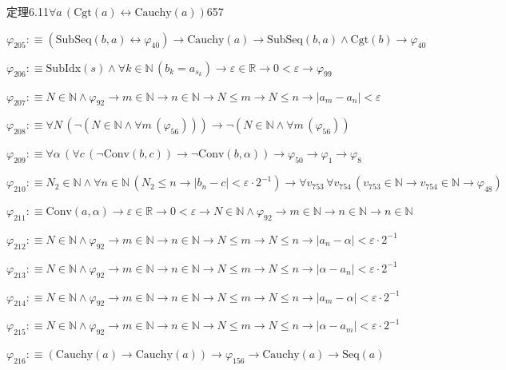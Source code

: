 \begin{fullproof}{定理6.11}{$\forall a\,(\mathrm{Cgt}(a) \leftrightarrow \mathrm{Cauchy}(a))$}{657}
\begin{abbrevlist}
\item $\varphi_{205} :\equiv (\mathrm{SubSeq}(b,a) \leftrightarrow \varphi_{40}) \to \mathrm{Cauchy}(a) \to \mathrm{SubSeq}(b,a) \land \mathrm{Cgt}(b) \to \varphi_{40}$
\item $\varphi_{206} :\equiv \mathrm{SubIdx}(s) \land \forall k \in \mathbb{N}\,(b_{k} = a_{s_{k}}) \to \varepsilon \in \mathbb{R} \to 0 < \varepsilon \to \varphi_{99}$
\item $\varphi_{207} :\equiv N \in \mathbb{N} \land \varphi_{92} \to m \in \mathbb{N} \to n \in \mathbb{N} \to N \leq m \to N \leq n \to \lvert a_{m} - a_{n} \rvert < \varepsilon$
\item $\varphi_{208} :\equiv \forall N\,(\neg (N \in \mathbb{N} \land \forall m\,(\varphi_{56}))) \to \neg (N \in \mathbb{N} \land \forall m\,(\varphi_{56}))$
\item $\varphi_{209} :\equiv \forall \alpha\,(\forall c\,(\neg \mathrm{Conv}(b,c)) \to \neg \mathrm{Conv}(b,\alpha)) \to \varphi_{50} \to \varphi_{1} \to \varphi_{8}$
\item $\varphi_{210} :\equiv N_{2} \in \mathbb{N} \land \forall n \in \mathbb{N}\,(N_{2} \leq n \to \lvert b_{n} - c \rvert < \varepsilon \cdot 2^{-1}) \to \forall v_{753}\,\forall v_{754}\,(v_{753} \in \mathbb{N} \to v_{754} \in \mathbb{N} \to \varphi_{48})$
\item $\varphi_{211} :\equiv \mathrm{Conv}(a,\alpha) \to \varepsilon \in \mathbb{R} \to 0 < \varepsilon \to N \in \mathbb{N} \land \varphi_{92} \to m \in \mathbb{N} \to n \in \mathbb{N} \to n \in \mathbb{N}$
\item $\varphi_{212} :\equiv N \in \mathbb{N} \land \varphi_{92} \to m \in \mathbb{N} \to n \in \mathbb{N} \to N \leq m \to N \leq n \to \lvert a_{n} - \alpha \rvert < \varepsilon \cdot 2^{-1}$
\item $\varphi_{213} :\equiv N \in \mathbb{N} \land \varphi_{92} \to m \in \mathbb{N} \to n \in \mathbb{N} \to N \leq m \to N \leq n \to \lvert \alpha - a_{n} \rvert < \varepsilon \cdot 2^{-1}$
\item $\varphi_{214} :\equiv N \in \mathbb{N} \land \varphi_{92} \to m \in \mathbb{N} \to n \in \mathbb{N} \to N \leq m \to N \leq n \to \lvert a_{m} - \alpha \rvert < \varepsilon \cdot 2^{-1}$
\item $\varphi_{215} :\equiv N \in \mathbb{N} \land \varphi_{92} \to m \in \mathbb{N} \to n \in \mathbb{N} \to N \leq m \to N \leq n \to \lvert \alpha - a_{m} \rvert < \varepsilon \cdot 2^{-1}$
\item $\varphi_{216} :\equiv (\mathrm{Cauchy}(a) \to \mathrm{Cauchy}(a)) \to \varphi_{156} \to \mathrm{Cauchy}(a) \to \mathrm{Seq}(a)$

\end{abbrevlist}
\end{fullproof}
